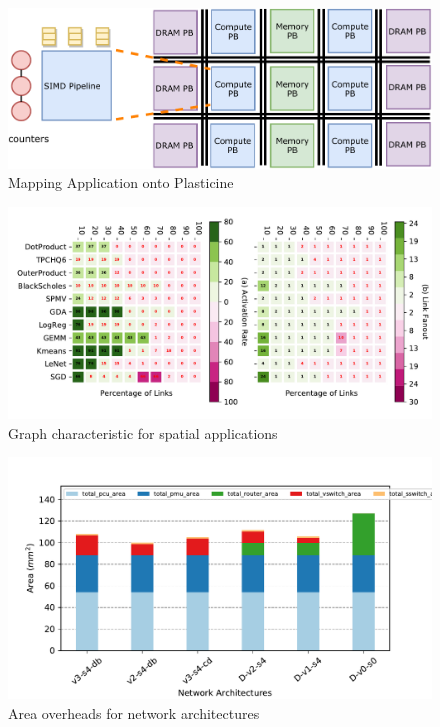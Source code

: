 \documentclass[portrait,a0,final]{a0poster}
\begin{document}
\begin{multicols}{3}
\begin{figure}[H]
\caption{Mapping Application onto Plasticine}
\label{fig:mapping}
\centering
\includegraphics[width=1\linewidth]{figs/arch.pdf}
\end{figure}

\begin{figure}[H]
\caption{Graph characteristic for spatial applications}
\label{fig:link}
\centering
\includegraphics[width=1\linewidth]{figs/link5.pdf}
\end{figure}

\begin{figure}[H]
\caption{Area overheads for network architectures}
\label{fig:area}
\centering
\includegraphics[width=1\linewidth]{figs/area.pdf}
\end{figure}


\end{multicols}
\end{document}
